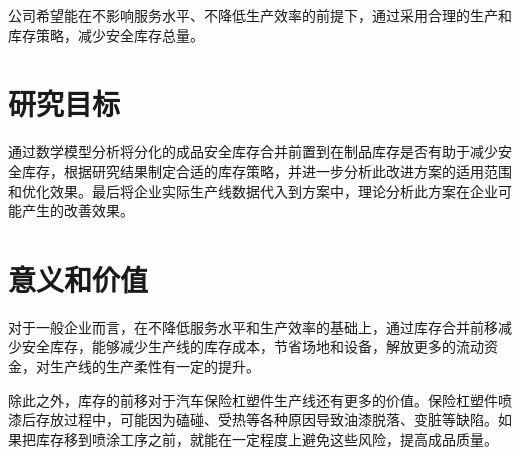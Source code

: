 公司希望能在不影响服务水平、不降低生产效率的前提下，通过采用合理的生产和库存策略，减少安全库存总量。

\section{研究目标}

通过数学模型分析将分化的成品安全库存合并前置到在制品库存是否有助于减少安全库存，根据研究结果制定合适的库存策略，并进一步分析此改进方案的适用范围和优化效果。最后将企业实际生产线数据代入到方案中，理论分析此方案在企业可能产生的改善效果。


\section{意义和价值}

对于一般企业而言，在不降低服务水平和生产效率的基础上，通过库存合并前移减少安全库存，能够减少生产线的库存成本，节省场地和设备，解放更多的流动资金，对生产线的生产柔性有一定的提升。

除此之外，库存的前移对于汽车保险杠塑件生产线还有更多的价值。保险杠塑件喷漆后存放过程中，可能因为磕碰、受热等各种原因导致油漆脱落、变脏等缺陷。如果把库存移到喷涂工序之前，就能在一定程度上避免这些风险，提高成品质量。

